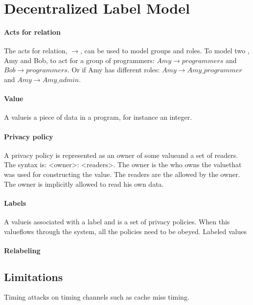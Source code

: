 \section{Decentralized Label Model}
\newcommand{\value}{value}
\newcommand{\values}{values}

\paragraph{Acts for relation}
The acts for relation, $\rightarrow$, can be used to model groups and roles.
To model two \principals, Amy and Bob, to act for a group of programmers: $Amy \rightarrow programmers$ and $Bob \rightarrow programmers$.
Or if Amy has different roles: $Amy \rightarrow Amy\_programmer$ and $Amy \rightarrow Amy\_admin$.

\paragraph{Value}
A \value is a piece of data in a program, for instance an integer.

\paragraph{Privacy policy}
A privacy policy is represented as an owner of some \value and a set of readers.
The syntax is: <owner>: <readers>.
The owner is the \principal who owns the \value that was used for constructing the \value.
The readers are the \principals allowed by the owner.
The owner is implicitly allowed to read his own data.


\paragraph{Labels}
A \value is associated with a label and is a set of privacy policies.
When this \value flows through the system, all the policies need to be obeyed.
Labeled \values

\paragraph{Relabeling}


\subsection{Limitations}
Timing attacks on timing channels such as cache miss timing.
